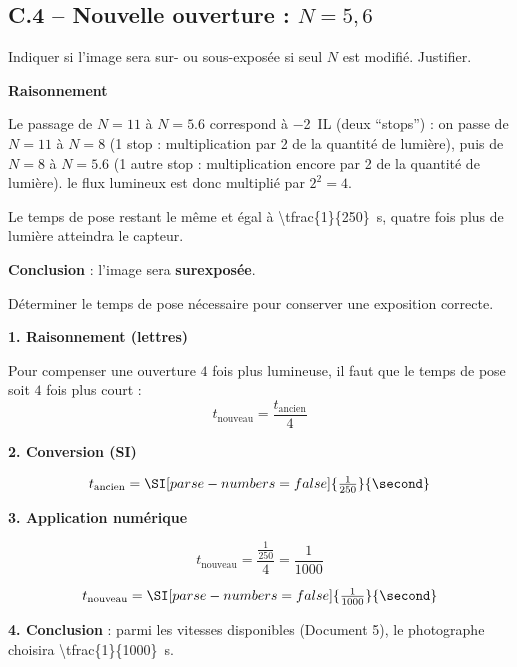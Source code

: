 \documentclass[answers]{exam}
\begin{document}
\begin{questions}
\subsection*{C.4 – Nouvelle ouverture : $N=5{,}6$}

\begin{questions}

\question[C.4.1] Indiquer si l’image sera sur- ou sous-exposée si seul $N$ est modifié. Justifier.

  \begin{solution}
  \textbf{Raisonnement}  
  \begin{compactitem}
    \item Le passage de $N=11$ à $N=5.6$ correspond à \SI{-2}{IL} (deux “stops”) : on passe de $N=11$ à $N=8$ (1 stop : multiplication par 2 de la quantité de lumière), puis de $N=8$ à $N=5.6$ (1 autre stop : multiplication encore par 2 de la quantité de lumière). le flux lumineux est donc multiplié par $2^2=4$.
    \item Le temps de pose restant le même et égal à \SI[parse-numbers=false]{\tfrac{1}{250}}{\second}, quatre fois plus de lumière atteindra le capteur.
  \end{compactitem}

  \textbf{Conclusion} : l’image sera \textbf{surexposée}.  
  \end{solution}



\question[C.4.2] Déterminer le temps de pose nécessaire pour conserver une exposition correcte.

  \begin{solution}
  \textbf{1. Raisonnement (lettres)}  

  Pour compenser une ouverture $4$ fois plus lumineuse, il faut que le temps de pose soit $4$ fois plus court :
  \[
    t_{\text{nouveau}} = \frac{t_{\text{ancien}}}{4}
  \]

  \textbf{2. Conversion (SI)}  

  \[
    t_{\text{ancien}} = \SI[parse-numbers=false]{\tfrac{1}{250}}{\second}
  \]

  \textbf{3. Application numérique}  

  \[
    t_{\text{nouveau}} = \frac{\tfrac{1}{250}}{4} = \frac{1}{1000}
  \]

  \[
    t_{\text{nouveau}} = \SI[parse-numbers=false]{\tfrac{1}{1000}}{\second}
  \]

  \textbf{4. Conclusion} : parmi les vitesses disponibles (Document 5), le photographe choisira \SI[parse-numbers=false]{\tfrac{1}{1000}}{\second}.  
  \end{solution}


\end{questions}
\end{questions}
\end{document}
